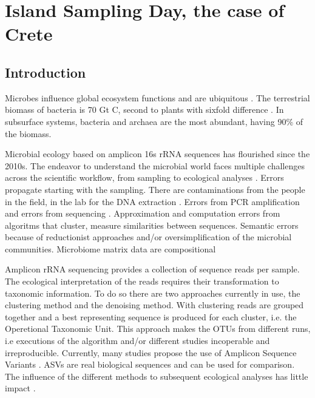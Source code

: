 % 
% 


\chapter{Island Sampling Day, the case of Crete}
\label{cha:isd-crete-soil}


\section{Introduction}\label{intro}

Microbes influence global ecosystem functions \parencite{falkowski2008microbial}
and are ubiquitous \parencite{delgado2016microbial}. The terrestrial biomass of bacteria is
70 Gt C, second to plants with sixfold difference \parencite{bar2018biomass}. In subsurface systems, bacteria and
archaea are the most abundant, having 90\% of the biomass.

Microbial ecology based on amplicon 16s rRNA sequences has flourished since the
2010s. The endeavor to understand the microbial world faces multiple challenges
across the scientific workflow, from sampling to ecological analyses \parencite{Lee2012}.
Errors propagate starting with the sampling. There are contaminations from the
people in the field, in the lab for the DNA extraction \parencite{EISENHOFER2019105}. 
Errors from PCR amplification and errors from sequencing \parencite{Schloss2011, Schimer2015}.
Approximation and computation errors from algoritms that cluster, measure similarities between
sequences. Semantic errors because of reductionist approaches and/or oversimplification
of the microbial communities. Microbiome matrix data are compositional \parencite{Gloor2017}


Amplicon rRNA sequencing provides a collection of sequence reads per sample. 
The ecological interpretation of the reads requires their transformation to
taxonomic information. To do so there are two approaches currently in use, 
the clustering method and the denoising method. With clustering reads are 
grouped together and a best representing sequence is produced for each 
cluster, i.e. the Operetional Taxonomic Unit. This approach makes the OTUs 
from different runs, i.e executions of the algorithm and/or different studies
incoperable and irreproducible. Currently, many studies propose the use of Amplicon Sequence Variants \parencite{Callahan2017}. 
ASVs are real biological sequences and can be used for comparison. The influence of the different methods to subsequent ecological analyses has
little impact \parencite{Glassman2018}.




